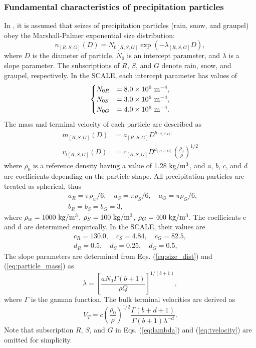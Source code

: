 \subsubsection{Fundamental characteristics of precipitation particles}
In \citet{tomita_2008}, it is assumed that seizes of precipitation particles (rain, snow, and graupel) obey the Marshall-Palmer exponential size distribution:
\begin{equation}
  n_{[R,S,G]}(D) = N_{0[R,S,G]}\exp(-\lambda_{[R,S,G]}D)\label{eq:size_dist},
\end{equation}
where $D$ is the diameter of particle, $N_{0}$ is an intercept parameter, and $\lambda$ is a slope parameter. The subscriptions of $R$, $S$, and $G$ denote rain, snow, and graupel, respectively. In the SCALE, each intercept parameter has values of
\begin{align}
\begin{cases}
  N_{0R}&=8.0\times 10^{6}{\rm \ m^{-4}}, \\ 
  N_{0S}&=3.0\times 10^{6}{\rm \ m^{-4}}, \\ 
  N_{0G}&=4.0\times 10^{6}{\rm \ m^{-4}}.
\end{cases}
\end{align}
The mass and terminal velocity of each particle are described as
\begin{align}
  m_{[R,S,G]}(D) &= a_{[R,S,G]}D^{b_{[R,S,G]}}\label{eq:particle_mass} \\
  v_{t[R,S,G]}(D) &= c_{[R,S,G]}D^{d_{[R,S,G]}}\left(\frac{\rho_{0}}{\rho}\right)^{1/2}
\end{align}
where $\rho_{0}$ is a reference density having a value of 1.28 ${\rm kg/m^{3}}$, and $a$, $b$, $c$, and $d$ are coefficients depending on the particle shape. All precipitation particles are treated as spherical, thus
\begin{align}
  &a_{R}=\pi \rho_{w}/6,\quad a_{S}=\pi \rho_{S}/6,\quad a_{G}=\pi \rho_{G}/6, \\
  &b_{R}=b_{S}=b_{G}=3,
\end{align}
where $\rho_{w}=1000 {\rm \ kg/m^{3}}$, $\rho_{S}=100 {\rm \ kg/m^{3}}$, $\rho_{G}=400 {\rm \ kg/m^{3}}$. The coefficients c and d are determined empirically. In the SCALE, their values are
\begin{align}
  c_{R}=130.0,\quad c_{S}=4.84,\quad c_{G}=82.5, \\
  d_{R}=0.5,\quad d_{S}=0.25,\quad d_{G}=0.5,
\end{align}
The slope parameters are determined from Eqs. (\ref{eq:size_dist}) and (\ref{eq:particle_mass}) as
\begin{equation}
  \lambda=\left[\frac{aN_{0}\Gamma (b+1)}{\rho Q}\right]^{1/(b+1)}\label{eq:lambda},
\end{equation}
where $\Gamma$ is the gamma function. The bulk terminal velocities are derived as
\begin{equation}
  V_{T}=c\left(\frac{\rho_{0}}{\rho}\right)^{1/2}\frac{\Gamma(b+d+1)}{\Gamma(b+1)\lambda^{-d}}\label{eq:tvelocity}.
\end{equation}
Note that subscription $R$, $S$, and $G$ in Eqs. (\ref{eq:lambda}) and (\ref{eq:tvelocity}) are omitted for simplicity.

